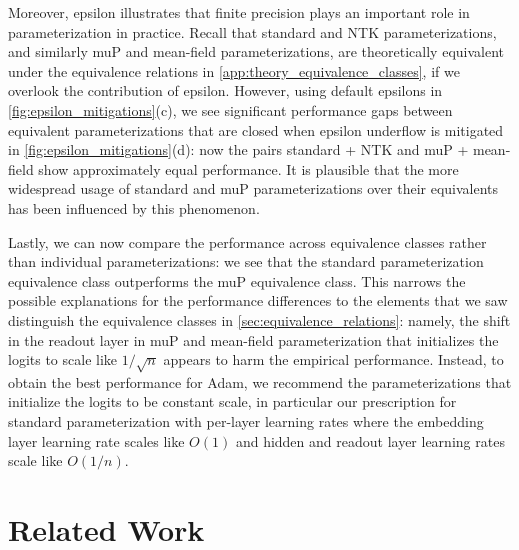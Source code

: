 \documentclass{article}
\theoremstyle{plain}
\theoremstyle{definition}
\theoremstyle{remark}
\begin{document}
Moreover, epsilon illustrates that finite precision plays an important role in parameterization in practice. Recall that standard and NTK parameterizations, and similarly muP and mean-field parameterizations, are theoretically equivalent under the equivalence relations in \cref{app:theory_equivalence_classes}, if we overlook the contribution of epsilon. However, using default epsilons in \cref{fig:epsilon_mitigations}(c), we see significant performance gaps between equivalent parameterizations that are closed when epsilon underflow is mitigated in \cref{fig:epsilon_mitigations}(d): now the pairs standard + NTK and muP + mean-field show approximately equal performance. It is plausible that the more widespread usage of standard and muP parameterizations over their equivalents has been influenced by this phenomenon.

Lastly, we can now compare the performance across equivalence classes rather than individual parameterizations: we see that the standard parameterization equivalence class outperforms the muP equivalence class. This narrows the possible explanations for the performance differences to the elements that we saw distinguish the equivalence classes in \cref{sec:equivalence_relations}: namely, the shift in the readout layer in muP and mean-field parameterization that initializes the logits to scale like $1/\sqrt{n}$ appears to harm the empirical performance. Instead, to obtain the best performance for Adam, we recommend the parameterizations that initialize the logits to be constant scale, in particular our prescription for standard parameterization with per-layer learning rates where the embedding layer learning rate scales like $O(1)$ and hidden and readout layer learning rates scale like $O(1/n)$.













\section{Related Work}
\end{document}
